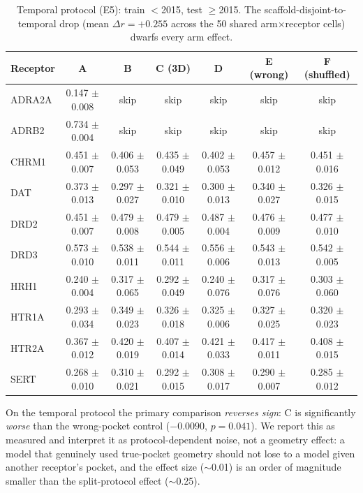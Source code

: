 \documentclass[11pt]{article}
\begin{document}
\begin{table}[t]
\centering\small
\caption{Temporal protocol (E5): train $<$2015, test $\ge$2015. The
scaffold-disjoint-to-temporal drop (mean $\Delta r=+0.255$ across the 50
shared arm$\times$receptor cells) dwarfs every arm effect.}
\label{tab:e5}
\begin{tabular}{lcccccc}
\toprule
Receptor & A & B & C (3D) & D & E (wrong) & F (shuffled) \\
\midrule
ADRA2A & 0.147 $\pm$ 0.008 & skip & skip & skip & skip & skip \\
ADRB2 & 0.734 $\pm$ 0.004 & skip & skip & skip & skip & skip \\
CHRM1 & 0.451 $\pm$ 0.007 & 0.406 $\pm$ 0.053 & 0.435 $\pm$ 0.049 & 0.402 $\pm$ 0.053 & 0.457 $\pm$ 0.012 & 0.451 $\pm$ 0.016 \\
DAT & 0.373 $\pm$ 0.013 & 0.297 $\pm$ 0.027 & 0.321 $\pm$ 0.010 & 0.300 $\pm$ 0.013 & 0.340 $\pm$ 0.027 & 0.326 $\pm$ 0.015 \\
DRD2 & 0.451 $\pm$ 0.007 & 0.479 $\pm$ 0.008 & 0.479 $\pm$ 0.005 & 0.487 $\pm$ 0.004 & 0.476 $\pm$ 0.009 & 0.477 $\pm$ 0.010 \\
DRD3 & 0.573 $\pm$ 0.010 & 0.538 $\pm$ 0.011 & 0.544 $\pm$ 0.011 & 0.556 $\pm$ 0.006 & 0.543 $\pm$ 0.013 & 0.542 $\pm$ 0.005 \\
HRH1 & 0.240 $\pm$ 0.004 & 0.317 $\pm$ 0.065 & 0.292 $\pm$ 0.049 & 0.240 $\pm$ 0.076 & 0.317 $\pm$ 0.076 & 0.303 $\pm$ 0.060 \\
HTR1A & 0.293 $\pm$ 0.034 & 0.349 $\pm$ 0.023 & 0.326 $\pm$ 0.018 & 0.325 $\pm$ 0.006 & 0.327 $\pm$ 0.025 & 0.320 $\pm$ 0.023 \\
HTR2A & 0.367 $\pm$ 0.012 & 0.420 $\pm$ 0.019 & 0.407 $\pm$ 0.014 & 0.421 $\pm$ 0.033 & 0.417 $\pm$ 0.011 & 0.408 $\pm$ 0.015 \\
SERT & 0.268 $\pm$ 0.010 & 0.310 $\pm$ 0.021 & 0.292 $\pm$ 0.015 & 0.308 $\pm$ 0.017 & 0.290 $\pm$ 0.007 & 0.285 $\pm$ 0.012 \\
\bottomrule
\end{tabular}
\end{table}

On the temporal protocol the primary comparison \emph{reverses sign}:
C is significantly \emph{worse} than the wrong-pocket control
($-0.0090$, $p=0.041$). We report this as measured and interpret it as
protocol-dependent noise, not a geometry effect: a model that genuinely
used true-pocket geometry should not lose to a model given another
receptor's pocket, and the effect size ($\sim$0.01) is an order of
magnitude smaller than the split-protocol effect ($\sim$0.25).
\end{document}
